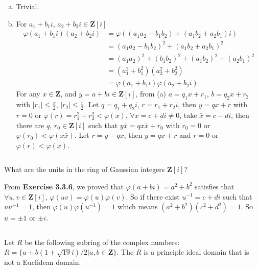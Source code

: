 \begin{answer}
    \begin{enumerate}[(a)]
        \item Trivial.
        \item For $a_{1}+b_{1}i$, $a_{2}+b_{2}i\in \mathbf{Z}[i]$ \[\begin{aligned}
            \varphi(a_{1}+b_{1}i)(a_{2}+b_{2}i)&=\varphi((a_{1}a_{2}-b_{1}b_{2})+(a_{1}b_{2}+a_{2}b_{1})i)\\&=(a_{1}a_{2}-b_{1}b_{2})^{2}+(a_{1}b_{2}+a_{2}b_{1})^{2}\\&=(a_{1}a_{2})^{2}+(b_{1}b_{2})^{2}+(a_{1}b_{2})^{2}+(a_{2}b_{1})^{2}\\&=(a_{1}^{2}+b_{1}^{2})(a_{2}^{2}+b_{2}^{2})\\&=\varphi(a_{1}+b_{1}i)\varphi(a_{2}+b_{2}i)
        \end{aligned}\]
        For any $x\in\mathbf{Z}$, and $y=a+bi\in\mathbf{Z}[i]$, from (a) $a=q_{1}x+r_{1}$, $b=q_{2}x+r_{2}$ with $\left| r_{1} \right| \leq \frac{x}{2}$, $\left| r_{2} \right| \leq \frac{x}{2}$. Let $q=q_{1}+q_{2}i$, $r=r_{1}+r_{2}i$, then $y=qx+r$ with $r=0$ or $\varphi(r)=r_{1}^{2}+r_{2}^{2}<\varphi(x)$. $\forall x=c+di\neq 0$, take $\bar{x}=c-di$, then there are $q$, $r_{0}\in\mathbf{Z}[i]$ such that $y\bar{x}=qx\bar{x}+r_{0}$ with $r_{0}=0$ or $\varphi(r_{0})<\varphi(x\bar{x})$. Let $r=y-qx$, then $y=qx+r$ and $r=0$ or $\varphi(r)<\varphi(x)$.
    \end{enumerate}
\end{answer}

$$ $$

\begin{ex}
    What are the units in the ring of Gaussian integers $\mathbf{Z}[i]$?
\end{ex}

\begin{answer}
    From \textbf{Exercise 3.3.6}, we proved that $\varphi(a+bi)=a^{2}+b^{2}$ satisfies that $\forall u,v\in \mathbf{Z}[i]$, $\varphi(uv)=\varphi(u)\varphi(v)$. So if there exist $u^{-1}=c+di$ such that $uu^{-1}=1$, then $\varphi(u)\varphi(u^{-1})=1$ which means $(a^{2}+b^{2})(c^{2}+d^{2})=1$. So $u=\pm 1$ or $\pm i$.
\end{answer}

$$ $$

\begin{ex}
    Let $R$ be the following subring of the complex numbers: $R=\{a+b(1+\sqrt{19}i) /2|a,b\in \mathbf{Z}\}$. The $R$ is a principle ideal domain that is not a Euclidean domain.
\end{ex}

